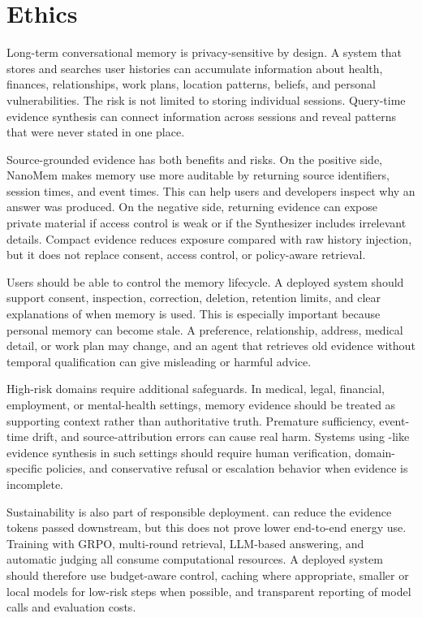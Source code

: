 \section{Ethics}
\label{sec:conclusion-ethics}

Long-term conversational memory is privacy-sensitive by design. A system that
stores and searches user histories can accumulate information about health,
finances, relationships, work plans, location patterns, beliefs, and personal
vulnerabilities. The risk is not limited to storing individual sessions.
Query-time evidence synthesis can connect information across sessions and
reveal patterns that were never stated in one place.

Source-grounded evidence has both benefits and risks. On the positive side,
NanoMem makes memory use more auditable by returning source identifiers,
session times, and event times. This can help users and developers inspect why
an answer was produced. On the negative side, returning evidence can expose
private material if access control is weak or if the Synthesizer includes
irrelevant details. Compact evidence reduces exposure compared with raw history
injection, but it does not replace consent, access control, or policy-aware
retrieval.

Users should be able to control the memory lifecycle. A deployed system should
support consent, inspection, correction, deletion, retention limits, and clear
explanations of when memory is used. This is especially important because
personal memory can become stale. A preference, relationship, address, medical
detail, or work plan may change, and an agent that retrieves old evidence
without temporal qualification can give misleading or harmful advice.

High-risk domains require additional safeguards. In medical, legal, financial,
employment, or mental-health settings, memory evidence should be treated as
supporting context rather than authoritative truth. Premature sufficiency,
event-time drift, and source-attribution errors can cause real harm. Systems
using \sys{}-like evidence synthesis in such settings should require human
verification, domain-specific policies, and conservative refusal or escalation
behavior when evidence is incomplete.

Sustainability is also part of responsible deployment. \sys{} can reduce the
evidence tokens passed downstream, but this does not prove lower end-to-end
energy use. Training with GRPO, multi-round retrieval, LLM-based answering, and
automatic judging all consume computational resources. A deployed system should
therefore use budget-aware control, caching where appropriate, smaller or local
models for low-risk steps when possible, and transparent reporting of model
calls and evaluation costs.

